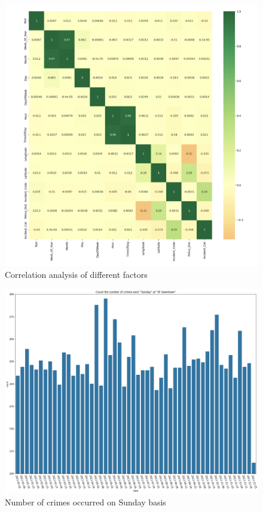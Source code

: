 \documentclass[11 pt,conference,final,]{IEEEtran}
\begin{document}
\begin{figure}

{\centering \includegraphics[width=0.9\linewidth]{img/fig8} 

}

\caption{Correlation analysis of different factors}\label{fig:unnamed-chunk-8}
\end{figure}

\begin{figure}

{\centering \includegraphics[width=0.8\linewidth]{img/fig9} 

}

\caption{Number of crimes occurred on Sunday basis}\label{fig:unnamed-chunk-9}
\end{figure}
\end{document}
